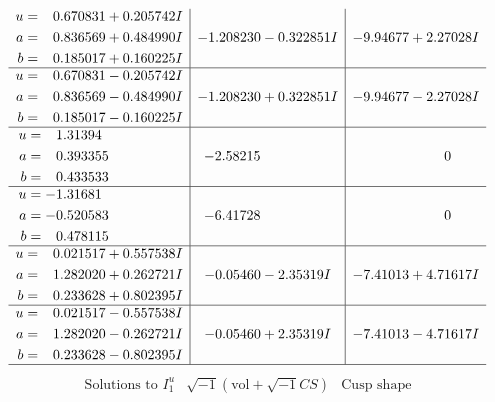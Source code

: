 \documentclass[1p]{elsarticle_modified}
\theoremstyle{definition}
\newcommand{\I}{\sqrt{-1}}
\begin{document}
$$\begin{array}{c|c|c}
\begin{aligned}
u &= \phantom{-}0.670831 + 0.205742 I \\
a &= \phantom{-}0.836569 + 0.484990 I \\
b &= \phantom{-}0.185017 + 0.160225 I\end{aligned}
 & -1.208230 - 0.322851 I & -9.94677 + 2.27028 I \\ \hline\begin{aligned}
u &= \phantom{-}0.670831 - 0.205742 I \\
a &= \phantom{-}0.836569 - 0.484990 I \\
b &= \phantom{-}0.185017 - 0.160225 I\end{aligned}
 & -1.208230 + 0.322851 I & -9.94677 - 2.27028 I \\ \hline\begin{aligned}
u &= \phantom{-}1.31394\phantom{ +0.000000I} \\
a &= \phantom{-}0.393355\phantom{ +0.000000I} \\
b &= \phantom{-}0.433533\phantom{ +0.000000I}\end{aligned}
 & -2.58215\phantom{ +0.000000I} & \phantom{-0.000000 } 0 \\ \hline\begin{aligned}
u &= -1.31681\phantom{ +0.000000I} \\
a &= -0.520583\phantom{ +0.000000I} \\
b &= \phantom{-}0.478115\phantom{ +0.000000I}\end{aligned}
 & -6.41728\phantom{ +0.000000I} & \phantom{-0.000000 } 0 \\ \hline\begin{aligned}
u &= \phantom{-}0.021517 + 0.557538 I \\
a &= \phantom{-}1.282020 + 0.262721 I \\
b &= \phantom{-}0.233628 + 0.802395 I\end{aligned}
 & -0.05460 - 2.35319 I & -7.41013 + 4.71617 I \\ \hline\begin{aligned}
u &= \phantom{-}0.021517 - 0.557538 I \\
a &= \phantom{-}1.282020 - 0.262721 I \\
b &= \phantom{-}0.233628 - 0.802395 I\end{aligned}
 & -0.05460 + 2.35319 I & -7.41013 - 4.71617 I\\
 \hline 
 \end{array}$$\newpage$$\begin{array}{c|c|c}  
\text{Solutions to }I^u_{1}& \I (\text{vol} + \sqrt{-1}CS) & \text{Cusp shape}\\

\end{array}$$
\end{document}
